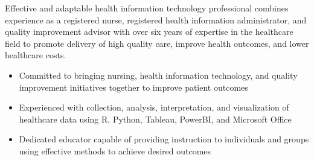 

\begin{cvparagraph}

Effective and adaptable health information technology professional combines experience as a registered nurse, registered health information administrator, and quality improvement advisor with over six years of expertise in the healthcare field to promote delivery of high quality care, improve health outcomes, and lower healthcare costs.
    \begin{itemize}[topsep=0pt,itemsep=0pt,parsep=0pt,partopsep=0pt,leftmargin=4mm]
      \item Committed to bringing nursing, health information technology, and quality improvement initiatives together to improve patient outcomes    
      \item Experienced with collection, analysis, interpretation, and visualization of healthcare data using R, Python, Tableau, PowerBI, and Microsoft Office
      \item Dedicated educator capable of providing instruction to individuals and groups using effective methods to achieve desired outcomes
    \end{itemize}
\end{cvparagraph}
